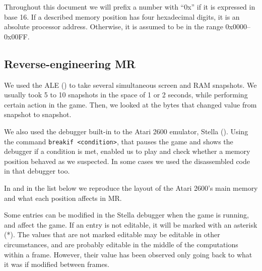 Throughout this document we will prefix a number with ``0x'' if it is expressed
in base 16. If a described memory position has four hexadecimal digits, it is an
absolute processor address. Otherwise, it is assumed to be in the range
0x0000--0x00FF.


\subsection{Reverse-engineering \acl{MR}\label{subsec:rev-eng-mr}}
We used the \acl{ALE} (\cite{bellemare2013arcade}) to take several simultaneous
screen and \ac{RAM} snapshots. We usually took 5 to 10 snapshots in the space of
1 or 2 seconds, while performing certain action in the game. Then, we looked at
the bytes that changed value from snapshot to snapshot.

We also used the debugger built-in to the Atari 2600 emulator, Stella
(\cite{stella}). Using the command \verb-breakif <condition>-, that pauses the
game and shows the debugger if a condition is met, enabled us to play and check
whether a memory position behaved as we suspected. In some cases we used the
disassembled code in that debugger too.

In  and in the list below we reproduce the layout of
the Atari 2600's main memory and what each position affects in \acl{MR}.

Some entries can be modified in the Stella debugger when the game is running,
and affect the game. If an entry is not editable, it will be marked with an
asterisk (*). The values that are not marked editable may be editable in other
circumstances, and are probably editable in the middle of the computations
within a frame. However, their value has been observed only going back to what
it was if modified between frames.

